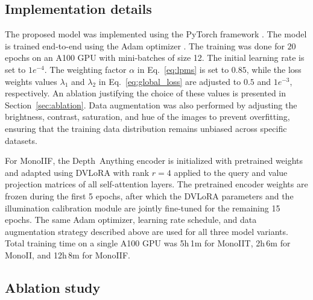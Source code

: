 \documentclass[a4paper,fleqn]{cas-dc}
\begin{document}
\subsection{Implementation details}

The proposed model was implemented using the PyTorch framework \citep{pytorch_2019}. The model is trained end-to-end  using the Adam optimizer \citep{Adam_ICLR_2015}. The training was done for $20$ epochs on an A100 GPU with mini-batches of size 12. The initial learning rate is set to $1e^{-4}$. The weighting factor $\alpha$ in Eq.~\eqref{eq:lpms} is set to $0.85$, while the loss weights values $\lambda_1$ and $\lambda_2$ in Eq.~\eqref{eq:global_loss} are adjusted to $0.5$ and $1 e^{-3}$, respectively. An ablation justifying the choice of these values is presented in Section~\ref{sec:ablation}. Data augmentation was also performed by adjusting the brightness, contrast, saturation, and hue of the images to prevent overfitting,  ensuring that the training data distribution remains unbiased across specific datasets. 
%

For MonoIIF, the Depth~Anything encoder is initialized with pretrained weights and adapted using DVLoRA with 
rank $r=4$ applied to the query and value projection matrices of all self-attention layers. The pretrained 
encoder weights are frozen during the first 5 epochs, after which the DVLoRA parameters and the illumination 
calibration module are jointly fine-tuned for the remaining 15 epochs. The same Adam optimizer, learning 
rate schedule, and data augmentation strategy described above are used for all three model variants. Total 
training time on a single A100 GPU was 5h\,1m for MonoIIT, 2h\,6m for MonoII, and 12h\,8m for MonoIIF.
%
\subsection{Ablation study \label{sec:ablation}}
%
\end{document}
